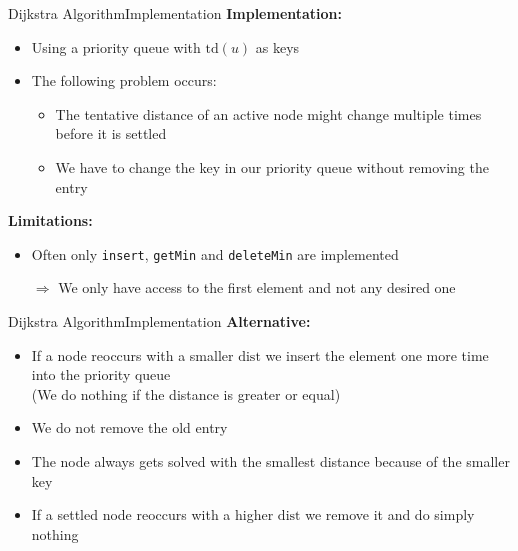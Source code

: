 
\begin{frame}{Dijkstra Algorithm}{Implementation}
  \textbf{Implementation:}
  \begin{itemize}
    \item
      Using a {\color{MainA}priority queue} with
      {\color{MainA}$\mathrm{td}(u)$} as keys
    \item
      The following problem occurs:
      \begin{itemize}
        \item
          The {\color{MainA}tentative distance} of an active node might
          change multiple times before it is settled
        \item
          We have to change the key in our {\color{MainA}priority queue}
          without removing the entry
      \end{itemize}
  \end{itemize}
  \vspace{1em}
  \textbf{Limitations:}
  \begin{itemize}
    \item
    Often only \texttt{insert}, \texttt{getMin} and \texttt{deleteMin}
    are implemented
    \item[$\Rightarrow$]
    We only have access to the first element and not any desired one
  \end{itemize}
\end{frame}


\begin{frame}{Dijkstra Algorithm}{Implementation}
  \textbf{Alternative:}
  \begin{itemize}
    \item
      If a node reoccurs with a smaller {\color{MainA}$\mathrm{dist}$}
      we insert the element one more time into the
      {\color{MainA}priority queue}\\
      {\color{gray}(We do nothing if the distance is greater or equal)}
    \item
      We do not remove the old entry
    \item
      The node always gets solved with the smallest distance because of the
      {\color{MainA}smaller key}
    \item
      If a settled node reoccurs with a higher {\color{MainA}$\mathrm{dist}$}
      we remove it and do simply {\color{MainA}nothing}
  \end{itemize}
\end{frame}

